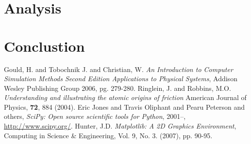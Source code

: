 \documentclass[12pt]{amsart}
\begin{document}
\section{Analysis}

\section{Conclustion}

\begin{thebibliography}{[1]}
   Gould, H. and Tobochnik J. and Christian, W. \emph{An Introduction to Computer Simulation Methods Second Edition Applications to Physical Systems},  Addison Wesley Publishing Group 2006, pg. 279-280.
   Ringlein, J. and Robbins, M.O. \emph{Understanding and illustrating the atomic origins of friction}  American Journal of Physics, {\bf 72}, 884 (2004).
   Eric Jones and Travis Oliphant and Pearu Peterson and others, \emph{{SciPy}: Open source scientific tools for {Python}}, 2001--, \url{http://www.scipy.org/}.
   Hunter, J.D. \emph{Matplotlib: A 2D Graphics Environment}, Computing in Science \& Engineering, Vol. 9, No. 3. (2007), pp. 90-95.
\end{thebibliography}
\end{document}
